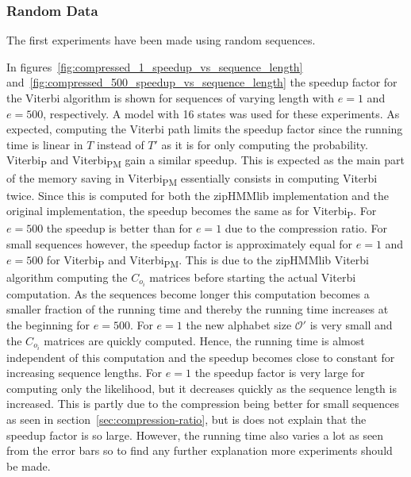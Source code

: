 \subsubsection{Random Data}

The first experiments have been made using random sequences.

In figures~\ref{fig:compressed_1_speedup_vs_sequence_length}
and~\ref{fig:compressed_500_speedup_vs_sequence_length} the speedup factor for
the Viterbi algorithm is shown for sequences of varying length with $e = 1$ and
$e = 500$, respectively. A model with 16 states was used for these experiments.
As expected, computing the Viterbi path limits the speedup factor since the
running time is linear in $T$ instead of $T'$ as it is for only computing the
probability. Viterbi\textsubscript{P} and Viterbi\textsubscript{PM} gain a
similar speedup. This is expected as the main part of the memory saving in
Viterbi\textsubscript{PM} essentially consists in computing Viterbi twice.
Since this is computed for both the zipHMMlib implementation and the original
implementation, the speedup becomes the same as for Viterbi\textsubscript{P}.
For $e = 500$ the speedup is better than for $e = 1$ due to the compression
ratio. For small sequences however, the speedup factor is approximately equal
for $e = 1$ and $e = 500$ for Viterbi\textsubscript{P} and
Viterbi\textsubscript{PM}. This is due to the zipHMMlib Viterbi algorithm
computing the $C_{o_i}$ matrices before starting the actual Viterbi
computation. As the sequences become longer this computation becomes a smaller
fraction of the running time and thereby the running time increases at the
beginning for $e = 500$. For $e = 1$ the new alphabet size $\mathcal{O'}$ is
very small and the $C_{o_i}$ matrices are quickly computed. Hence, the running
time is almost independent of this computation and the speedup becomes close to
constant for increasing sequence lengths. For $e = 1$ the speedup factor is
very large for computing only the likelihood, but it decreases quickly as the
sequence length is increased. This is partly due to the compression being
better for small sequences as seen in section~\ref{sec:compression-ratio}, but
is does not explain that the speedup factor is so large. However, the running
time also varies a lot as seen from the error bars so to find any further
explanation more experiments should be made.

